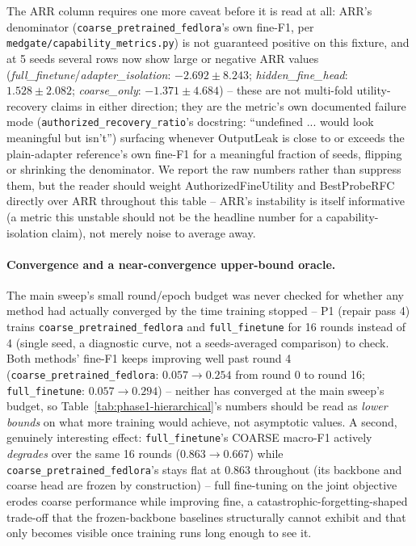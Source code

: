 \documentclass[11pt]{article}
\begin{document}
The ARR column requires one more caveat before it is read at all: ARR's
denominator (\texttt{coarse\_pretrained\_fedlora}'s own fine-F1, per
\texttt{medgate/capability\_metrics.py}) is not guaranteed positive on this
fixture, and at 5 seeds several rows now show large or negative ARR values
(\emph{full\_finetune}/\emph{adapter\_isolation}: $-2.692\pm8.243$;
\emph{hidden\_fine\_head}: $1.528\pm2.082$; \emph{coarse\_only}:
$-1.371\pm4.684$) -- these are not multi-fold utility-recovery claims in
either direction; they are the metric's own documented failure mode
(\texttt{authorized\_recovery\_ratio}'s docstring: ``undefined ... would
look meaningful but isn't'') surfacing whenever OutputLeak is close to or
exceeds the plain-adapter reference's own fine-F1 for a meaningful fraction
of seeds, flipping or shrinking the denominator. We report the raw numbers
rather than suppress them, but the reader should weight
AuthorizedFineUtility and BestProbeRFC directly over ARR throughout this
table -- ARR's instability is itself informative (a metric this unstable
should not be the headline number for a capability-isolation claim), not
merely noise to average away.

\paragraph{Convergence and a near-convergence upper-bound oracle.} The
main sweep's small round/epoch budget was never checked for whether any
method had actually converged by the time training stopped -- P1 (repair
pass 4) trains \texttt{coarse\_pretrained\_fedlora} and \texttt{full\_finetune}
for 16 rounds instead of 4 (single seed, a diagnostic curve, not a
seeds-averaged comparison) to check. Both methods' fine-F1 keeps improving
well past round 4 (\texttt{coarse\_pretrained\_fedlora}: $0.057\to0.254$
from round 0 to round 16; \texttt{full\_finetune}: $0.057\to0.294$) --
neither has converged at the main sweep's budget, so
Table~\ref{tab:phase1-hierarchical}'s numbers should be read as
\emph{lower bounds} on what more training would achieve, not asymptotic
values. A second, genuinely interesting effect: \texttt{full\_finetune}'s
COARSE macro-F1 actively \emph{degrades} over the same 16 rounds
($0.863\to0.667$) while \texttt{coarse\_pretrained\_fedlora}'s stays flat
at $0.863$ throughout (its backbone and coarse head are frozen by
construction) -- full fine-tuning on the joint objective erodes coarse
performance while improving fine, a catastrophic-forgetting-shaped
trade-off that the frozen-backbone baselines structurally cannot exhibit
and that only becomes visible once training runs long enough to see it.
\end{document}
